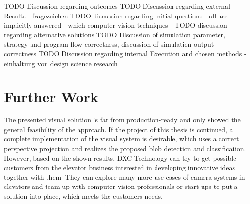 TODO Discussion regarding outcomes
TODO Discussion regarding external Results - fragezeichen
TODO discussion regarding initial questions
 - all are implicitly answered
 - which computer vision techniques
 - 
TODO discussion regarding alternative solutions
TODO Discussion of simulation parameter, strategy and program flow correctness, discussion of simulation output correctness
TODO  Discussion regarding internal Execution and chosen methods - einhaltung von design science research

\section{Further Work}

The presented visual solution is far from production-ready and only showed the general feasibility of the approach.
If the project of this thesis is continued, a complete implementation of the visual system is desirable, which uses a correct perspective projection and realizes the proposed blob detection and classification.
However, based on the shown results, DXC Technology can try to get possible customers from the elevator business interested in developing innovative ideas together with them.
They can explore many more use cases of camera systems in elevators and team up with computer vision professionals or start-ups to put a solution into place, which meets the customers needs.
